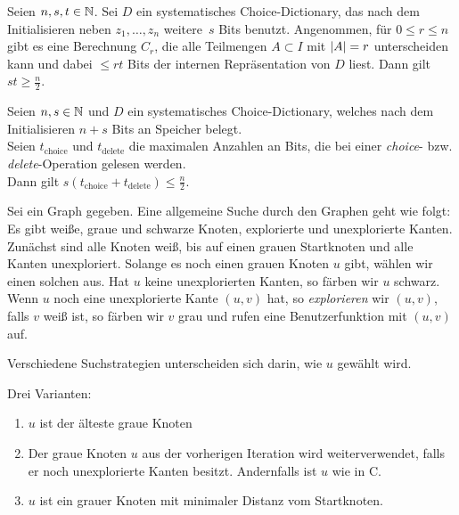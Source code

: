 \documentclass{cheat-sheet}
\begin{document}
\begin{thm}
  Seien $n, s, t \in \mathbb{N}$.
  Sei $D$ ein systematisches Choice-Dictionary, das nach dem Initialisieren neben $z_1, \ldots, z_n$ weitere~$s$ Bits benutzt.
  Angenommen, für $0 \leq r \leq n$ gibt es eine Berechnung $C_r$, die alle Teilmengen $A \subset I$ mit $\lvert A\rvert = r$ unterscheiden kann und dabei $\leq rt$ Bits der internen Repräsentation von $D$ liest.
  Dann gilt $st \geq \tfrac{n}{2}$.
\end{thm}

\begin{kor}
  Seien $n, s \in \mathbb{N}$ und $D$ ein systematisches Choice-Dictionary, welches nach dem Initialisieren $n + s$ Bits an Speicher belegt. \\
  Seien $t_{\text{choice}}$ und $t_{\text{delete}}$ die maximalen Anzahlen an Bits, die bei einer \textit{choice}- bzw. \textit{delete}-Operation gelesen werden. \\
  Dann gilt $s (t_{\text{choice}} + t_{\text{delete}}) \leq \tfrac{n}{2}$.
\end{kor}



\begin{defn}
  Sei ein Graph gegeben.
  Eine allgemeine Suche durch den Graphen geht wie folgt:
  Es gibt weiße, graue und schwarze Knoten, explorierte und unexplorierte Kanten.
  Zunächst sind alle Knoten weiß, bis auf einen grauen Startknoten und alle Kanten unexploriert.
  Solange es noch einen grauen Knoten $u$ gibt, wählen wir einen solchen aus.
  Hat $u$ keine unexplorierten Kanten, so färben wir $u$ schwarz.
  Wenn $u$ noch eine unexplorierte Kante $(u, v)$ hat, so \textit{explorieren} wir $(u, v)$, \dh{} falls $v$ weiß ist, so färben wir $v$ grau und rufen eine Benutzerfunktion mit $(u, v)$ auf.
\end{defn}

\begin{bem}
  Verschiedene Suchstrategien unterscheiden sich darin, wie $u$ gewählt wird.
\end{bem}

\begin{defn}
  Drei Varianten:
  \begin{enumerate}[label=\Alph*.,leftmargin=2em]
    \item $u$ ist der älteste graue Knoten
    \item Der graue Knoten $u$ aus der vorherigen Iteration wird weiterverwendet, falls er noch unexplorierte Kanten besitzt.
    Andernfalls ist $u$ wie in C.
    \item $u$ ist ein grauer Knoten mit minimaler Distanz vom Startknoten.
  \end{enumerate}
\end{defn}
\end{document}
